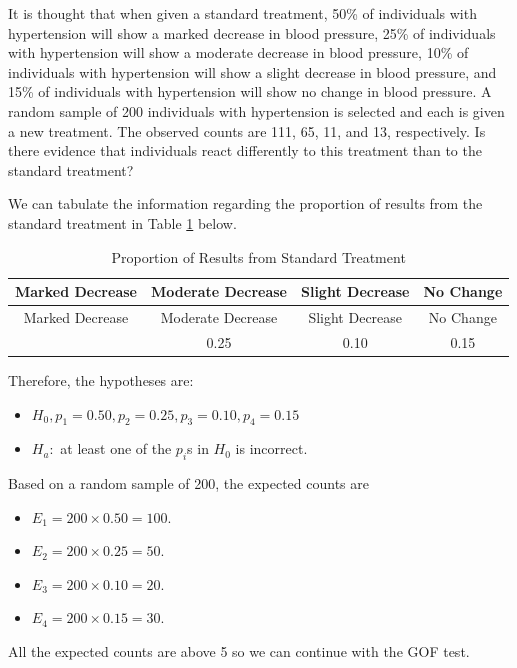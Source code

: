 \documentclass[
]{book}
\providecommand{\tightlist}{%
  \setlength{\itemsep}{0pt}\setlength{\parskip}{0pt}}
\theoremstyle{definition}
\theoremstyle{definition}
\theoremstyle{definition}
\theoremstyle{definition}
\theoremstyle{remark}
\begin{document}
It is thought that when given a standard treatment, 50\% of individuals with hypertension will show a marked decrease in blood pressure, 25\% of individuals with hypertension will show a moderate decrease in blood pressure, 10\% of individuals with hypertension will show a slight decrease in blood pressure, and 15\% of individuals with hypertension will show no change in blood pressure. A random sample of 200 individuals with hypertension is selected and each is given a new treatment. The observed counts are 111, 65, 11, and 13, respectively. Is there evidence that individuals react differently to this treatment than to the standard treatment?

We can tabulate the information regarding the proportion of results from the standard treatment in Table \ref{tab:egGOF} below.

\begin{longtable}[]{@{}cccc@{}}
\caption{\label{tab:egGOF} Proportion of Results from Standard Treatment}\tabularnewline
\toprule\noalign{}
Marked Decrease & Moderate Decrease & Slight Decrease & No Change \\
\midrule\noalign{}
\endfirsthead
\toprule\noalign{}
Marked Decrease & Moderate Decrease & Slight Decrease & No Change \\
\midrule\noalign{}
\endhead
\bottomrule\noalign{}
\endlastfoot
0.50 & 0.25 & 0.10 & 0.15 \\
\end{longtable}

Therefore, the hypotheses are:

\begin{itemize}
\tightlist
\item
  \(H_0, p_1 = 0.50, p_2 = 0.25, p_3 = 0.10, p_4 = 0.15\)
\item
  \(H_a:\) at least one of the \(p_i\)s in \(H_0\) is incorrect.
\end{itemize}

Based on a random sample of 200, the expected counts are

\begin{itemize}
\tightlist
\item
  \(E_1 = 200 \times 0.50 = 100\).
\item
  \(E_2 = 200 \times 0.25 = 50\).
\item
  \(E_3 = 200 \times 0.10 = 20\).
\item
  \(E_4 = 200 \times 0.15 = 30\).
\end{itemize}

All the expected counts are above 5 so we can continue with the GOF test.
\end{document}
